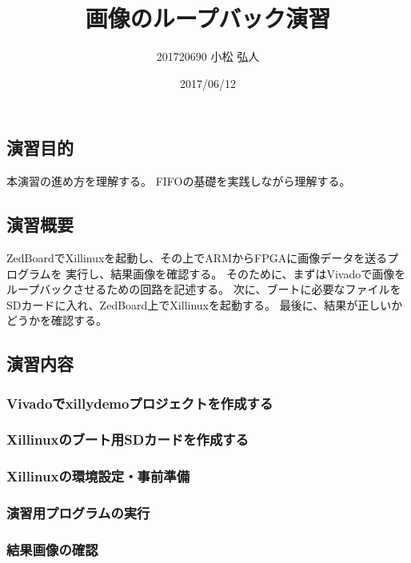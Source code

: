 \documentclass[11pt]{jsarticle}
\title{画像のループバック演習}
\author{201720690 小松 弘人}
\date{2017/06/12}
\begin{document}
\maketitle
\subsection*{演習目的}
本演習の進め方を理解する。
FIFOの基礎を実践しながら理解する。

\subsection*{演習概要}
ZedBoardでXillinuxを起動し、その上でARMからFPGAに画像データを送るプログラムを
実行し、結果画像を確認する。
そのために、まずはVivadoで画像をループバックさせるための回路を記述する。
次に、ブートに必要なファイルをSDカードに入れ、ZedBoard上でXillinuxを起動する。
最後に、結果が正しいかどうかを確認する。

\subsection*{演習内容}
\subsubsection*{Vivadoでxillydemoプロジェクトを作成する}
\subsubsection*{Xillinuxのブート用SDカードを作成する}
\subsubsection*{Xillinuxの環境設定・事前準備}
\subsubsection*{演習用プログラムの実行}
\subsubsection*{結果画像の確認}
\end{document}
